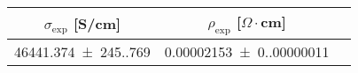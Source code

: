 \begin{tabular}{ccc}
\toprule
$\sigma_{\exp}$ [S/cm] & $\rho_{\exp}$ [$\Omega  \cdot$cm] \\
\midrule
\num{46441.374(245.769)} & \num{0.00002153(0.00000011)} \\
\bottomrule
\end{tabular}
